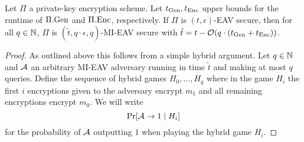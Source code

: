 \begin{lemma}
	Let $\Pi$ a private-key encryption scheme. Let $t_{\mathrm{Gen}}, t_{\mathrm{Enc}}$ upper bounds for the runtime of $\Pi.\mathrm{Gen}$ and $\Pi.\mathrm{Enc}$, respectively.  If $\Pi$ is $(t, \epsilon)$-EAV secure, then for all $q \in \mathbb{N}$, $\Pi$ is $(\tilde{t}, q \cdot \epsilon, q)$-MI-EAV secure with $\tilde{t} = t - \mathcal{O}(q \cdot (t_{\mathrm{Gen}} + t_{\mathrm{Enc}}))$.
\end{lemma}
\begin{proof}
	As outlined above this follows from a simple hybrid argument. Let $q \in \mathbb{N}$ and $\mathcal{A}$ an arbitrary MI-EAV adversary running in time $\tilde{t}$ and making at most $q$ queries. Define the sequence of hybrid games $H_0, \ldots, H_q$ where in the game $H_i$ the first $i$ encryptions given to the adversary encrypt $m_1$ and all remaining encryptions encrypt $m_0$. We will write
	\[
		\pr{\adv \rightarrow 1 \mid H_i}
	\]
	for the probability of $\mathcal{A}$ outputting $1$ when playing the hybrid game $H_i$.


\end{proof}
